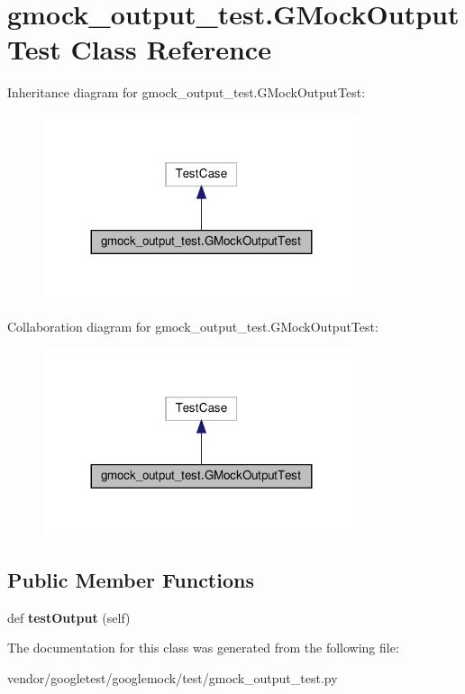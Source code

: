 \hypertarget{classgmock__output__test_1_1_g_mock_output_test}{}\section{gmock\+\_\+output\+\_\+test.\+G\+Mock\+Output\+Test Class Reference}
\label{classgmock__output__test_1_1_g_mock_output_test}


Inheritance diagram for gmock\+\_\+output\+\_\+test.\+G\+Mock\+Output\+Test\+:
\nopagebreak
\begin{figure}[H]
\begin{center}
\leavevmode
\includegraphics[width=263pt]{classgmock__output__test_1_1_g_mock_output_test__inherit__graph}
\end{center}
\end{figure}


Collaboration diagram for gmock\+\_\+output\+\_\+test.\+G\+Mock\+Output\+Test\+:
\nopagebreak
\begin{figure}[H]
\begin{center}
\leavevmode
\includegraphics[width=263pt]{classgmock__output__test_1_1_g_mock_output_test__coll__graph}
\end{center}
\end{figure}
\subsection*{Public Member Functions}
\begin{DoxyCompactItemize}
\item 
\mbox{\label{classgmock__output__test_1_1_g_mock_output_test_a661e7846690f48328fd9e0834fde9980}} 
def {\bfseries test\+Output} (self)
\end{DoxyCompactItemize}


The documentation for this class was generated from the following file\+:\begin{DoxyCompactItemize}
\item 
vendor/googletest/googlemock/test/gmock\+\_\+output\+\_\+test.\+py\end{DoxyCompactItemize}
